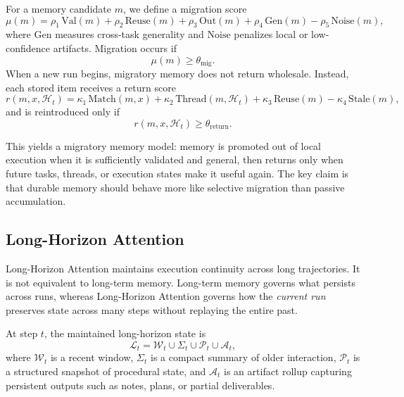 \documentclass[a4paper,fleqn]{cas-sc}
\begin{document}
For a memory candidate $m$, we define a migration score
\begin{equation}
\mu(m) = \rho_1 \, \mathrm{Val}(m) + \rho_2 \, \mathrm{Reuse}(m) + \rho_3 \, \mathrm{Out}(m) + \rho_4 \, \mathrm{Gen}(m) - \rho_5 \, \mathrm{Noise}(m),
\end{equation}
where $\mathrm{Gen}$ measures cross-task generality and $\mathrm{Noise}$ penalizes local or low-confidence artifacts. Migration occurs if
\begin{equation}
\mu(m) \geq \theta_{\text{mig}}.
\end{equation}
When a new run begins, migratory memory does not return wholesale. Instead, each stored item receives a return score
\begin{equation}
r(m, x, \mathcal{H}_t) = \kappa_1 \, \mathrm{Match}(m, x) + \kappa_2 \, \mathrm{Thread}(m, \mathcal{H}_t) + \kappa_3 \, \mathrm{Reuse}(m) - \kappa_4 \, \mathrm{Stale}(m),
\end{equation}
and is reintroduced only if
\begin{equation}
r(m, x, \mathcal{H}_t) \geq \theta_{\text{return}}.
\end{equation}

This yields a migratory memory model: memory is promoted out of local execution when it is sufficiently validated and general, then returns only when future tasks, threads, or execution states make it useful again. The key claim is that durable memory should behave more like selective migration than passive accumulation.

\subsection{Long-Horizon Attention}

Long-Horizon Attention maintains execution continuity across long trajectories. It is not equivalent to long-term memory. Long-term memory governs what persists across runs, whereas Long-Horizon Attention governs how the \emph{current run} preserves state across many steps without replaying the entire past.

At step $t$, the maintained long-horizon state is
\begin{equation}
\mathcal{L}_t = \mathcal{W}_t \cup \Sigma_t \cup \mathcal{P}_t \cup \mathcal{A}_t,
\end{equation}
where $\mathcal{W}_t$ is a recent window, $\Sigma_t$ is a compact summary of older interaction, $\mathcal{P}_t$ is a structured snapshot of procedural state, and $\mathcal{A}_t$ is an artifact rollup capturing persistent outputs such as notes, plans, or partial deliverables.
\end{document}
